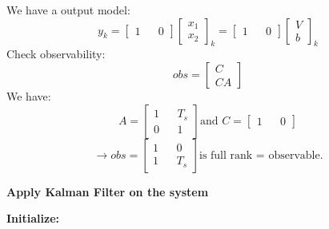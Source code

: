 \documentclass[12pt,a4paper]{article}
\begin{document}
	We have a output model:
	\begin{equation}
		\boxed{
			y_k = 
			\begin{bmatrix}
				1 &   & 0 
			\end{bmatrix}
			\begin{bmatrix}
				x_1 \\
				x_2 
			\end{bmatrix}_k = 
			\begin{bmatrix}
				1 &   & 0 
			\end{bmatrix}
			\begin{bmatrix}
				V \\
				b 
			\end{bmatrix}_k
		}
		\label{eq11}
	\end{equation}
	Check observability:
	\[obs = 
	\begin{bmatrix}
		C  \\
		CA 
	\end{bmatrix}\]
	We have:
	\[A = 
	\begin{bmatrix}
		1 &   & T_s \\
		0 &   & 1   
	\end{bmatrix} \text{and } C = 
	\begin{bmatrix}
		1 &   & 0 
	\end{bmatrix}\]
	\[\rightarrow obs = 
	\begin{bmatrix}
		1 &   & 0   \\
		1 &   & T_s 
	\end{bmatrix} \text{is full rank = observable.}\]
	\begin{center}
		\textbf{Apply Kalman Filter on the system}
	\end{center}
	\textbf{Initialize:}
\end{document}
